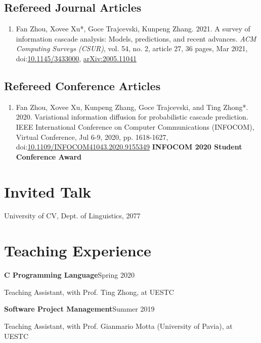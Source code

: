 \documentclass{article}
\newcommand{\cvsection}[1]{\section*{\rmfamily#1}}
\newcommand{\cvsubsection}[1]{\subsection*{\rmfamily\hspace{1.6em}#1}}
\begin{document}
\cvsubsection{Refereed Journal Articles}

\begin{enumerate}[resume]
    \item Fan Zhou, Xovee Xu*, Goce Trajcevski, Kunpeng Zhang. 2021. A survey of information cascade analysis: Models, predictions, and recent advances. \textit{ACM Computing Surveys (CSUR)}, vol. 54, no. 2, article 27, 36 pages, Mar 2021, doi:\href{https://xovee.cn/html/paper-redirects/csur2021.html}{10.1145/3433000}, \href{https://arxiv.org/abs/2005.11041}{arXiv:2005.11041}
\end{enumerate}

\cvsubsection{Refereed Conference Articles}

\begin{enumerate}[resume]
    \item Fan Zhou, Xovee Xu, Kunpeng Zhang, Goce Trajcevski, and Ting Zhong*. 2020. Variational information diffusion for probabilistic cascade prediction. IEEE International Conference on Computer Communications (INFOCOM), Virtual Conference, Jul 6-9, 2020, pp. 1618-1627, doi:\href{https://doi.org/10.1109/INFOCOM41043.2020.9155349}{10.1109/INFOCOM41043.2020.9155349}
    \newline \textbf{\color{red}INFOCOM 2020 Student Conference Award}
\end{enumerate}




\cvsection{Invited Talk}
\indent 

University of CV, Dept. of Linguistics, 2077 



\cvsection{Teaching Experience}
\indent

\textbf{C Programming Language}\hfill Spring 2020

\hspace{2em}Teaching Assistant, with Prof. Ting Zhong, at UESTC

\textbf{Software Project Management}\hfill Summer 2019

\hspace{2em}Teaching Assistant, with Prof. Gianmario Motta (University of Pavia), at UESTC




\end{document}
